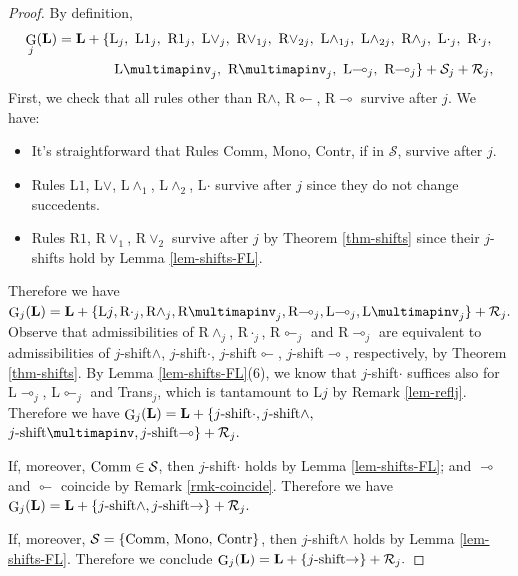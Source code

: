 \documentclass[runningheads]{llncs}
\renewcommand{\L}{\mathbf{L}}
\DeclareMathOperator{\Glivenko}{G}
\begin{document}
\begin{proof}
By definition,
\begin{align*}
	\Glivenko_j(\L)=\L+\{
	&\textnormal{L}_j, 
	\textnormal{ L$1_j$}, \textnormal{ R$1_j$}, \textnormal{ L$\vee_j$}, \textnormal{ R$\vee_{1j}$}, \textnormal{ R$\vee_{2j}$}, \textnormal{ L$\wedge_{1j}$}, \textnormal{ L$\wedge_{2j}$}, \textnormal{ R$\wedge_j$}, \text{ L$\cdot_j$}, \textnormal{ R$\cdot_j$}, 
	\\&
	\textnormal{ L$\multimapinv_j$}, \textnormal{ R$\multimapinv_j$}, \textnormal{ L$\multimap_j$}, \textnormal{ R$\multimap_j$}%
	\}+\mathcal{S}_j+\mathcal{R}_j,
\end{align*}
First, we check that all rules other than R$\wedge$, R$\multimapinv$, R$\multimap$ survive after $j$. We have:
\begin{itemize}
	\item It's straightforward that Rules Comm, Mono, Contr, if in $\mathcal{S}$, survive after $j$.
	\item Rules L$1$, L$\vee$, L$\wedge_1$, L$\wedge_2$, L$\cdot$ survive after $j$ since they do not change succedents.
	\item Rules R$1$, R$\vee_1$, R$\vee_2$ survive after $j$ by Theorem \ref{thm-shifts} since their $j$-shifts hold by Lemma \ref{lem-shifts-FL}.
\end{itemize}
Therefore we have
$\Glivenko_j(\L)=\L+\{\textnormal{L$j$},\textnormal{R$\cdot_j$},\textnormal{R$\wedge_j$},\textnormal{R$\multimapinv_j$},\textnormal{R$\multimap_j$},\textnormal{L$\multimap_j$},\textnormal{L$\multimapinv_j$} \}+\mathcal{R}_j.$
Observe that admissibilities of \textnormal{R$\wedge_j$}, \textnormal{R$\cdot_j$}, \textnormal{R$\multimapinv_j$} and \textnormal{R$\multimap_j$} are equivalent to admissibilities of $j$-shift$\wedge$, $j$-shift$\cdot$, $j$-shift$\multimapinv$, $j$-shift$\multimap$, respectively, by Theorem \ref{thm-shifts}. 
By Lemma \ref{lem-shifts-FL}(6), we know that $j$-shift$\cdot$ suffices also for L$\multimap_j$, L$\multimapinv_j$ and Trans$_j$, which is tantamount to L$j$ by Remark \ref{lem-reflj}.
Therefore we have
$\Glivenko_j(\L)=\L+\{\textnormal{$j$-shift$\cdot$},\textnormal{$j$-shift$\wedge$},$ $\textnormal{$j$-shift$\multimapinv$},\textnormal{$j$-shift$\multimap$} \}+\mathcal{R}_j.$

If, moreover, $\textnormal{Comm}\in \mathcal{S}$, then $j$-shift$\cdot$ holds by Lemma \ref{lem-shifts-FL}; and $\multimap$ and $\multimapinv$ coincide by Remark \ref{rmk-coincide}. Therefore we have
$\Glivenko_j(\L)=\L+\{\textnormal{$j$-shift$\wedge$},\textnormal{$j$-shift$\to$} \}+\mathcal{R}_j.$

If, moreover, $\mathcal{S}=\{\textnormal{Comm, Mono, Contr}\}$, then $j$-shift$\wedge$ holds by Lemma \ref{lem-shifts-FL}. Therefore we conclude
$\Glivenko_j(\L)=\L+\{\textnormal{$j$-shift$\to$} \}+\mathcal{R}_j.$
\end{proof}
\end{document}
